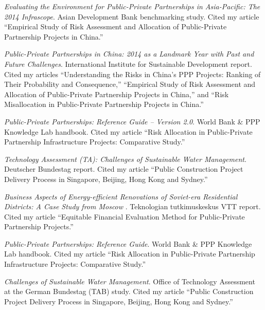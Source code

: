 \documentclass[11pt,a4paper]{report} %
\begin{document}
\begin{tablist}
        \item[2015] \tab{}\textit{Evaluating the Environment for Public-Private Partnerships in Asia-Pacific: The 2014 Infrascope}. Asian Development Bank benchmarking study. Cited my article “Empirical Study of Risk Assessment and Allocation of Public-Private Partnership Projects in China.”  
    
        \item[2015] \tab{}\textit{Public-Private Partnerships in China: 2014 as a Landmark Year with Past and Future Challenges}. International Institute for Sustainable Development report. Cited my articles “Understanding the Risks in China's PPP Projects: Ranking of Their Probability and Consequence,” “Empirical Study of Risk Assessment and Allocation of Public-Private Partnership Projects in China,” and “Risk Misallocation in Public-Private Partnership Projects in China.”  
    
        \item[2014] \tab{}\textit{Public-Private Partnerships: Reference Guide -- Version 2.0}. World Bank \& PPP Knowledge Lab handbook. Cited my article “Risk Allocation in Public-Private Partnership Infrastructure Projects: Comparative Study.”  

        \item[2014] \tab{}\textit{Technology Assessment (TA): Challenges of Sustainable Water Management}. Deutscher Bundestag report. Cited my article “Public Construction Project Delivery Process in Singapore, Beijing, Hong Kong and Sydney.”  

        \item[2014] \tab{}\textit{Business Aspects of Energy-efficient Renovations of Soviet-era Residential Districts: A Case Study from Moscow }. Teknologian tutkimuskeskus VTT report. Cited my article “Equitable Financial Evaluation Method for Public-Private Partnership Projects.”  
    
        \item[2013] \tab{}\textit{Public-Private Partnerships: Reference Guide}. World Bank \& PPP Knowledge Lab handbook. Cited my article “Risk Allocation in Public-Private Partnership Infrastructure Projects: Comparative Study.”  
    
        \item[2013] \tab{}\textit{Challenges of Sustainable Water Management}. Office of Technology Assessment at the German Bundestag (TAB) study. Cited my article “Public Construction Project Delivery Process in Singapore, Beijing, Hong Kong and Sydney.”  
    

\end{tablist}
\end{document}

